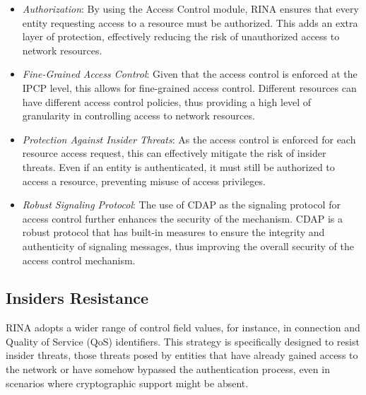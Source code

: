 \documentclass{ieeeaccess}
\begin{document}
\begin{itemize}
	\item \textit{Authorization}: By using the Access Control module, RINA ensures that every entity requesting access to a resource must be authorized. This adds an extra layer of protection, effectively reducing the risk of unauthorized access to network resources.
	\item \textit{Fine-Grained Access Control}: Given that the access control is enforced at the IPCP level, this allows for fine-grained access control. Different resources can have different access control policies, thus providing a high level of granularity in controlling access to network resources.
	\item \textit{Protection Against Insider Threats}: As the access control is enforced for each resource access request, this can effectively mitigate the risk of insider threats. Even if an entity is authenticated, it must still be authorized to access a resource, preventing misuse of access privileges.
	\item \textit{Robust Signaling Protocol}: The use of CDAP as the signaling protocol for access control further enhances the security of the mechanism. CDAP is a robust protocol that has built-in measures to ensure the integrity and authenticity of signaling messages, thus improving the overall security of the access control mechanism.
\end{itemize}

\subsection{Insiders Resistance}
RINA adopts a wider range of control field values, for instance, in connection and Quality of Service (QoS) identifiers. This strategy is specifically designed to resist insider threats, those threats posed by entities that have already gained access to the network or have somehow bypassed the authentication process, even in scenarios where cryptographic support might be absent.
\end{document}
